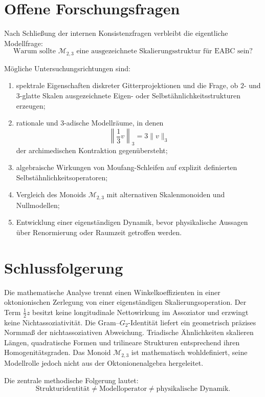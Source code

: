 \documentclass[11pt,a4paper]{article}
\theoremstyle{definition}
\newcommand{\MtwoThree}{\mathcal M_{2,3}}
\begin{document}
\section{Offene Forschungsfragen}

Nach Schließung der internen Konsistenzfragen verbleibt die eigentliche Modellfrage:
\begin{equation}
\boxed{
\text{Warum sollte }\MtwoThree
\text{ eine ausgezeichnete Skalierungsstruktur für EABC sein?}
}
\end{equation}

Mögliche Untersuchungsrichtungen sind:
\begin{enumerate}
  \item spektrale Eigenschaften diskreter Gitterprojektionen und die Frage, ob $2$- und $3$-glatte Skalen ausgezeichnete Eigen- oder Selbstähnlichkeitsstrukturen erzeugen;
  \item rationale und $3$-adische Modellräume, in denen
  \[
  \left\|\frac13v\right\|_3=3\|v\|_3
  \]
  der archimedischen Kontraktion gegenübersteht;
  \item algebraische Wirkungen von Moufang-Schleifen auf explizit definierten Selbstähnlichkeitsoperatoren;
  \item Vergleich des Monoids $\MtwoThree$ mit alternativen Skalenmonoiden und Nullmodellen;
  \item Entwicklung einer eigenständigen Dynamik, bevor physikalische Aussagen über Renormierung oder Raumzeit getroffen werden.
\end{enumerate}

\section{Schlussfolgerung}

Die mathematische Analyse trennt einen Winkelkoeffizienten in einer oktonionischen Zerlegung von einer eigenständigen Skalierungsoperation. Der Term $\tfrac12z$ besitzt keine longitudinale Nettowirkung im Assoziator und erzwingt keine Nichtassoziativität. Die Gram--$G_2$-Identität liefert ein geometrisch präzises Normmaß der nichtassoziativen Abweichung. Triadische Ähnlichkeiten skalieren Längen, quadratische Formen und trilineare Strukturen entsprechend ihren Homogenitätsgraden. Das Monoid $\MtwoThree$ ist mathematisch wohldefiniert, seine Modellrolle jedoch nicht aus der Oktonionenalgebra hergeleitet.

Die zentrale methodische Folgerung lautet:
\[
\boxed{
\text{Strukturidentität}
\neq
\text{Modelloperator}
\neq
\text{physikalische Dynamik}.
}
\]
\end{document}

